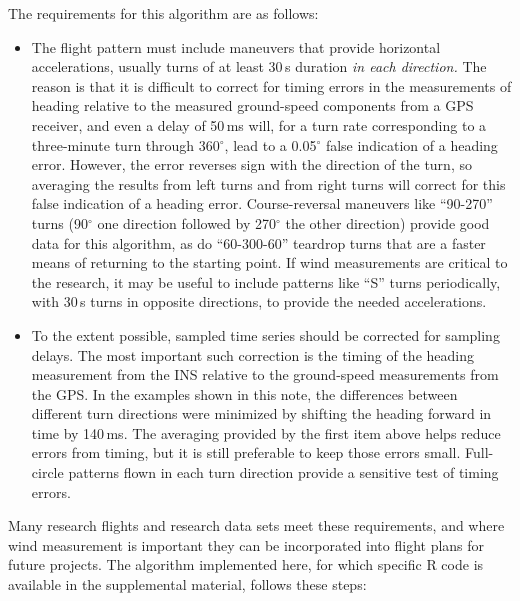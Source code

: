 \documentclass[english,british,amtd,bookmarks=false,unicode=true]{copernicus}\usepackage[]{graphicx}\usepackage[]{color}
\begin{document}
The requirements for this algorithm are as follows:
\begin{itemize}
\item The flight pattern must include maneuvers that provide horizontal
accelerations, usually turns of at least 30\,s duration \emph{in
each direction.} The reason is that it is difficult to correct for
timing errors in the measurements of heading relative to the measured
ground-speed components from a GPS receiver, and even a delay of 50\,ms
will, for a turn rate corresponding to a three-minute turn through
360$^{\circ}$, lead to a 0.05$^{\circ}$ false indication of a heading
error. However, the error reverses sign with the direction of the
turn, so averaging the results from left turns and from right turns
will correct for this false indication of a heading error. Course-reversal
maneuvers like ``90-270'' turns (90$^{\circ}$ one direction followed
by 270$^{\circ}$ the other direction) provide good data for this
algorithm, as do ``60-300-60'' teardrop turns that are a faster
means of returning to the starting point. If wind measurements are
critical to the research, it may be useful to include patterns like
``S'' turns periodically, with 30\,s turns in opposite directions,
to provide the needed accelerations.
\item To the extent possible, sampled time series should be corrected for
sampling delays. The most important such correction is the timing
of the heading measurement from the INS relative to the ground-speed
measurements from the GPS. In the examples shown in this note, the
differences between different turn directions were minimized by shifting
the heading forward in time by 140\,ms. The averaging provided by
the first item above helps reduce errors from timing, but it is still
preferable to keep those errors small. Full-circle patterns flown
in each turn direction provide a sensitive test of timing errors.
\end{itemize}
Many research flights and research data sets meet these requirements,
and where wind measurement is important they can be incorporated into
flight plans for future projects. The algorithm implemented here,
for which specific R code is available in the supplemental material,
follows these steps:
\end{document}
